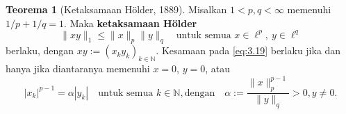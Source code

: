 \documentclass[aspectratio=169,11pt]{beamer}
\theoremstyle{definition}
\newtheorem{teorema}{Teorema}
\newcommand{\N}{\mathbb{N}}
\begin{document}
\begin{frame}{\insertsection}{\insertsubsection}
  \setcounter{teorema}{28}
  \setcounter{equation}{18}
  \begin{teorema}[Ketaksamaan H\"older, 1889]\label{thm:3.29}
    Misalkan $1<p,q<\infty$ memenuhi $1/p+1/q=1$. Maka \textbf{ketaksamaan H\"older}
    \begin{equation}
      \|xy\|_1 \leq \|x\|_p\|y\|_q
      \quad \text{untuk semua } x\in\ell^p,\ y\in\ell^q \label{eq:3.19}
    \end{equation}
    berlaku, dengan $xy := (x_k y_k)_{k\in\N}$. Kesamaan pada \eqref{eq:3.19} berlaku jika dan hanya jika diantaranya memenuhi $x=0$, $y=0$, atau
    \begin{equation}
      |x_k|^{p-1}=\alpha|y_k| \quad \text{untuk semua } k\in\N,
      \text{dengan}\quad \alpha := \frac{\|x\|_p^{p-1}}{\|y\|_q}>0,  y\ne 0. \label{eq:3.20}
    \end{equation}
  \end{teorema}
\end{frame}
\end{document}
